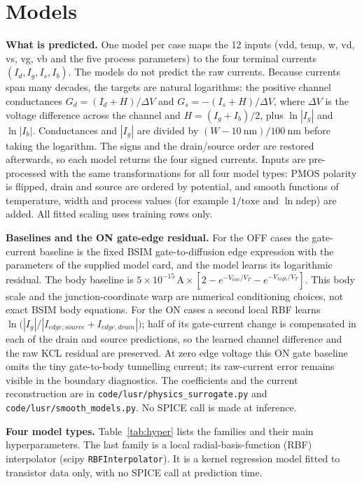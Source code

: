 \section{Models}
\label{sec:models}

\textbf{What is predicted.} One model per case maps the 12 inputs (vdd, temp, w, vd, vs, vg, vb and the five process parameters) to the four terminal currents $(I_d,I_g,I_s,I_b)$. The models do not predict the raw currents. Because currents span many decades, the targets are natural logarithms: the positive channel conductances $G_d=(I_d+H)/\Delta V$ and $G_s=-(I_s+H)/\Delta V$, where $\Delta V$ is the voltage difference across the channel and $H=(I_g+I_b)/2$, plus $\ln|I_g|$ and $\ln|I_b|$. Conductances and $|I_g|$ are divided by $(W-\SI{10}{\nano\meter})/\SI{100}{\nano\meter}$ before taking the logarithm. The signs and the drain/source order are restored afterwards, so each model returns the four signed currents. Inputs are pre-processed with the same transformations for all four model types: PMOS polarity is flipped, drain and source are ordered by potential, and smooth functions of temperature, width and process values (for example $1/\mathrm{toxe}$ and $\ln\mathrm{ndep}$) are added. All fitted scaling uses training rows only.

\textbf{Baselines and the ON gate-edge residual.} For the OFF cases the gate-current baseline is the fixed BSIM gate-to-diffusion edge expression with the parameters of the supplied model card, and the model learns its logarithmic residual. The body baseline is $5\times10^{-15}\,\mathrm{A}\times[2-e^{-V_{low}/V_T}-e^{-V_{high}/V_T}]$. This body scale and the junction-coordinate warp are numerical conditioning choices, not exact BSIM body equations. For the ON cases a second local RBF learns $\ln\!\big(|I_g|/|I_{edge,source}+I_{edge,drain}|\big)$; half of its gate-current change is compensated in each of the drain and source predictions, so the learned channel difference and the raw KCL residual are preserved. At zero edge voltage this ON gate baseline omits the tiny gate-to-body tunnelling current; its raw-current error remains visible in the boundary diagnostics. The coefficients and the current reconstruction are in \texttt{code/lusr/physics\_surrogate.py} and \texttt{code/lusr/smooth\_models.py}. No SPICE call is made at inference.

\textbf{Four model types.} Table~\ref{tab:hyper} lists the families and their main hyperparameters. The last family is a local radial-basis-function (RBF) interpolator (scipy \texttt{RBFInterpolator}). It is a kernel regression model fitted to transistor data only, with no SPICE call at prediction time.

